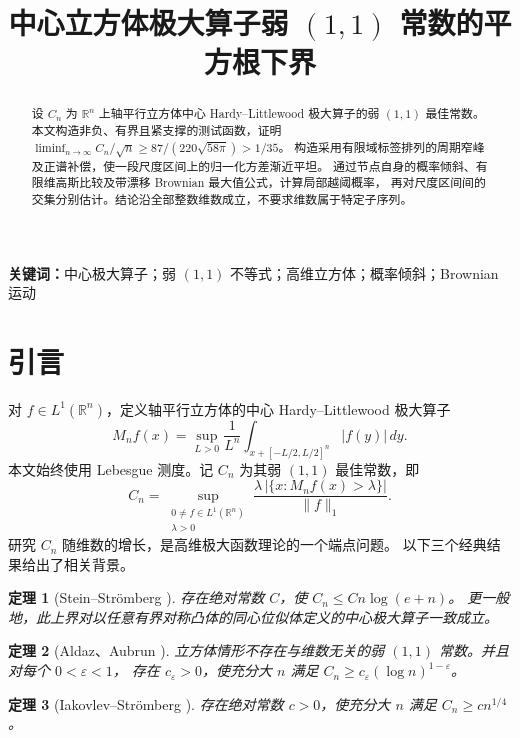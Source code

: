 \documentclass[UTF8,a4paper,11pt,fontset=fandol]{ctexart}
\title{中心立方体极大算子弱 $(1,1)$ 常数的平方根下界}
\author{}
\date{}
\newtheorem{historical}{定理}
\theoremstyle{remark}
\begin{document}
\maketitle
\vspace{-2em}
\begin{abstract}
设 $C_n$ 为 $\mathbb R^n$ 上轴平行立方体中心 Hardy--Littlewood 极大算子的弱 $(1,1)$ 最佳常数。
本文构造非负、有界且紧支撑的测试函数，证明
$\liminf_{n\to\infty}C_n/\sqrt n\ge87/(220\sqrt{58\pi})>1/35$。
构造采用有限域标签排列的周期窄峰及正谱补偿，使一段尺度区间上的归一化方差渐近平坦。
通过节点自身的概率倾斜、有限维高斯比较及带漂移 Brownian 最大值公式，计算局部越阈概率，
再对尺度区间间的交集分别估计。结论沿全部整数维数成立，不要求维数属于特定子序列。
\end{abstract}
\noindent\textbf{关键词：}中心极大算子；弱 $(1,1)$ 不等式；高维立方体；概率倾斜；Brownian 运动
\par\medskip
\section{引言}
对 $f\in L^1(\mathbb R^n)$，定义轴平行立方体的中心 Hardy--Littlewood 极大算子
\[
 M_nf(x)=\sup_{L>0}\frac1{L^n}\int_{x+[-L/2,L/2]^n}|f(y)|\,dy.
\]
本文始终使用 Lebesgue 测度。记 $C_n$ 为其弱 $(1,1)$ 最佳常数，即
\begin{equation}\label{eq:definitionCn}
 C_n=\sup_{\substack{0\ne f\in L^1(\mathbb R^n)\\ \lambda>0}}
 \frac{\lambda\,|\{x:M_nf(x)>\lambda\}|}{\|f\|_1}.
\end{equation}
研究 $C_n$ 随维数的增长，是高维极大函数理论的一个端点问题。
以下三个经典结果给出了相关背景。

\begin{historical}[Stein--Strömberg \cite{SS1983}]
存在绝对常数 $C$，使 $C_n\le Cn\log(e+n)$。
更一般地，此上界对以任意有界对称凸体的同心位似体定义的中心极大算子一致成立。
\end{historical}

\begin{historical}[Aldaz、Aubrun \cite{Aldaz2011,Aubrun2009}]
立方体情形不存在与维数无关的弱 $(1,1)$ 常数。并且对每个 $0<\varepsilon<1$，
存在 $c_\varepsilon>0$，使充分大 $n$ 满足
$C_n\ge c_\varepsilon(\log n)^{1-\varepsilon}$。
\end{historical}

\begin{historical}[Iakovlev--Strömberg \cite{IS2013}]
存在绝对常数 $c>0$，使充分大 $n$ 满足 $C_n\ge c n^{1/4}$。
\end{historical}
\end{document}
